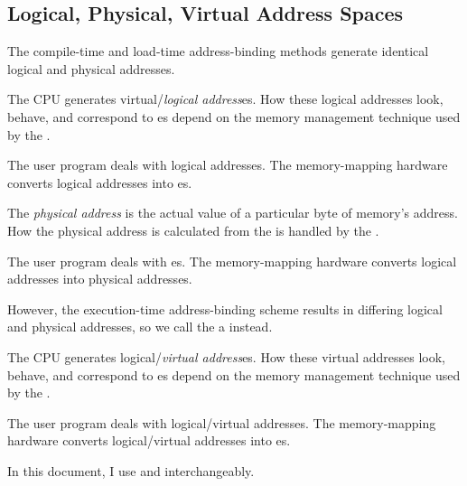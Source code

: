 \subsection{Logical, Physical, Virtual Address Spaces}\label{subsec:Logical_Physical_Virtual_Address_Space}
The compile-time and load-time address-binding methods generate identical logical and physical addresses.

\begin{definition}\label{def:Logical_Address}
  The CPU generates virtual/\emph{logical address}es.
  How these logical addresses look, behave, and correspond to es depend on the memory management technique used by the .

  The user program deals with logical addresses.
  The memory-mapping hardware converts logical addresses into es.
\end{definition}

\begin{definition}\label{def:Physical_Address}
  The \emph{physical address} is the actual value of a particular byte of memory's address.
  How the physical address is calculated from the  is handled by the .

  The user program deals with es.
  The memory-mapping hardware converts logical addresses into physical addresses.
\end{definition}

However, the execution-time address-binding scheme results in differing logical and physical addresses, so we call the  a  instead.

\begin{definition}\label{def:Virtual_Address}
  The CPU generates logical/\emph{virtual address}es.
  How these virtual addresses look, behave, and correspond to es depend on the memory management technique used by the .

  The user program deals with logical/virtual addresses.
  The memory-mapping hardware converts logical/virtual addresses into es.

  \begin{remark}
    In this document, I use  and  interchangeably.
  \end{remark}
\end{definition}



